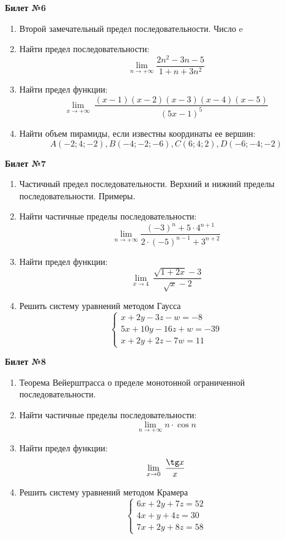 \documentclass[a4paper, 12pt]{article}
\begin{document}
\begin{center}
    \textbf{Билет №6}
\end{center}
\begin{enumerate}
\item Второй замечательный предел последовательности. Число e
\item Найти предел последовательности:  \[\lim \limits_{n \to +\infty} \frac{2n^2 - 3n - 5}{1 + n + 3n^2}\]
\item Найти предел функции: 
\[\lim \limits_{x \to +\infty}\ \frac{(x-1)(x-2)(x-3)(x-4)(x-5)}{(5x-1)^5}\]
\item Найти объем пирамиды, если известны координаты ее вершин:
\[A(-2;4;-2), B(-4;-2;-6), C(6;4;2), D(-6;-4;-2)\]
\end{enumerate}

\begin{center}
    \textbf{Билет №7}
\end{center}
\begin{enumerate}
\item Частичный предел последовательности. Верхний и нижний пределы последовательности. Примеры.
\item Найти частичные пределы последовательности: \[\lim \limits_{n \to +\infty} \frac{(-3)^n + 5 \cdot 4^{n+1}}{2 \cdot (-5)^{n-1} + 3^{n+2}}\]
\item Найти предел функции: 
\[\lim \limits_{x \to 4}\ \frac{\sqrt{1+2x} - 3}{\sqrt{x} - 2}\]
\item Решить систему уравнений методом Гаусса
\[
	\begin{cases}
		x + 2y - 3z - w = -8 \\
		5x + 10y - 16z + w = -39 \\
		x + 2y + 2z - 7w = 11
	\end{cases}
\]
\end{enumerate}

\begin{center}
    \textbf{Билет №8}
\end{center}
\begin{enumerate}
\item Теорема Вейерштрасса о пределе монотонной ограниченной последовательности. 
\item Найти частичные пределы последовательности: \[\lim \limits_{n \to +\infty} n \cdot \cos n\]
\item Найти предел функции: 
\[\lim \limits_{x \to 0}\ \frac{\tg x}{x}\]
\item Решить систему уравнений методом Крамера
\[
	\begin{cases}
		6x + 2y + 7z = 52 \\
		4x + y + 4z = 30 \\
		7x + 2y + 8z = 58
	\end{cases}
\]
\end{enumerate}
\end{document}
